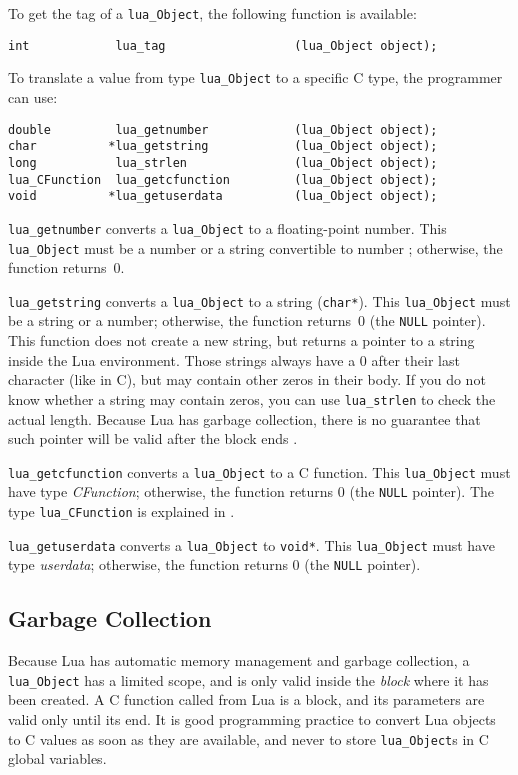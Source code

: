 To get the tag of a \verb|lua_Object|,
the following function is available:
\begin{verbatim}
int            lua_tag                  (lua_Object object);
\end{verbatim}

To translate a value from type \verb|lua_Object| to a specific C type,
the programmer can use:
\begin{verbatim}
double         lua_getnumber            (lua_Object object);
char          *lua_getstring            (lua_Object object);
long           lua_strlen               (lua_Object object);
lua_CFunction  lua_getcfunction         (lua_Object object);
void          *lua_getuserdata          (lua_Object object);
\end{verbatim}

\verb|lua_getnumber| converts a \verb|lua_Object| to a floating-point number.
This \verb|lua_Object| must be a number or a string convertible to number
; otherwise, the function returns~0.

\verb|lua_getstring| converts a \verb|lua_Object| to a string (\verb|char*|).
This \verb|lua_Object| must be a string or a number;
otherwise, the function returns~0 (the \verb|NULL| pointer).
This function does not create a new string,
but returns a pointer to a string inside the Lua environment.
Those strings always have a 0 after their last character (like in C),
but may contain other zeros in their body.
If you do not know whether a string may contain zeros,
you can use \verb|lua_strlen| to check the actual length.
Because Lua has garbage collection,
there is no guarantee that such pointer will be valid after the block ends
.

\verb|lua_getcfunction| converts a \verb|lua_Object| to a C function.
This \verb|lua_Object| must have type \emph{CFunction};
otherwise, the function returns 0 (the \verb|NULL| pointer).
The type \verb|lua_CFunction| is explained in .

\verb|lua_getuserdata| converts a \verb|lua_Object| to \verb|void*|.
This \verb|lua_Object| must have type \emph{userdata};
otherwise, the function returns 0 (the \verb|NULL| pointer).

\subsection{Garbage Collection}\label{GC}
Because Lua has automatic memory management and garbage collection,
a \verb|lua_Object| has a limited scope,
and is only valid inside the \emph{block} where it has been created.
A C function called from Lua is a block,
and its parameters are valid only until its end.
It is good programming practice to convert Lua objects to C values
as soon as they are available,
and never to store \verb|lua_Object|s in C global variables.

